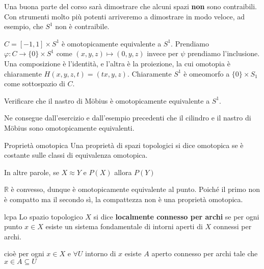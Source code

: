 Una buona parte del corso sarà dimostrare che alcuni spazi \textbf{non} sono
contraibili. Con strumenti molto più potenti arriveremo a dimostrare in modo
veloce, ad esempio, che \(S^{1}\) non è contraibile. 

\begin{example}
    \(C = [-1, 1] \times S^{1}\)  è omotopicamente equivalente a \(S^{1}\).
    Prendiamo \(\varphi : C \to \{0\} \times S^{1}\) come \({(x, y, z)} \mapsto
    (0, y, z)\) invece per \(\psi\) prendiamo l'inclusione. Una composizione è
    l'identità, e l'altra è la proiezione, la cui omotopia è chiaramente \(H(x,
    y, z, t) = (tx, y, z)\). Chiaramente \(S^{1}\) è omeomorfo a \(\{0\} \times
    S_{1}\) come sottospazio di \(C\).
\end{example}

\begin{eser}
    Verificare che il nastro di Möbius è omotopicamente equivalente a \(S^{1}\).

    \tcblower

\end{eser}

\begin{remark}
    Ne consegue dall'esercizio e dall'esempio precedenti che il cilindro e il
    nastro di Möbius sono omotopicamente equivalenti.
\end{remark}

\begin{definition}{Proprietà omotopica}
    Una proprietà di spazi topologici si dice omotopica se è costante sulle
    classi di equivalenza omotopica.

    In altre parole, se \(X \approx Y\) e \(P(X)\) allora \(P(Y)\) 
\end{definition}

\(\mathbb{R}\) è convesso, dunque è omotopicamente equivalente al punto. Poiché
il primo non è compatto ma il secondo sì, la compattezza non è una proprietà
omotopica.

\begin{definition}{lcpa}
    Lo spazio topologico \(X\) si dice \textbf{localmente connesso per archi} se
    per ogni punto \(x \in X\) esiste un sistema fondamentale di intorni aperti
    di \(X\) connessi per archi.
\end{definition}
\begin{note}
    cioè per ogni \(x \in X\) e \(\forall U\) intorno di \(x\) esiste \(A\)
    aperto connesso per archi tale che \(x \in A \subseteq U \) 
\end{note}

